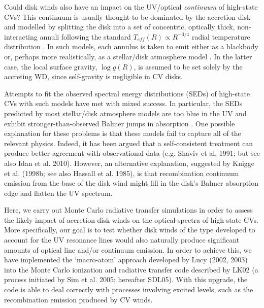 \documentclass[preprint, a4paper, 11pt]{aastex}
\begin{document}
Could disk winds also have an impact on the UV/optical {\em continuum}
of high-state CVs? This continuum is usually thought to be dominated
by the accretion disk and modelled by splitting the disk into
a set of concentric, optically thick, non-interacting annuli following
the standard $T_{eff}(R) \propto R^{-3/4}$ radial temperature
distribution \citep{shakurasunyaev1973}. In such
models, each annulus is taken to emit either as a blackbody or,
perhaps more realistically, as a stellar/disk atmosphere model
\citep{Schwarzenberg-Czerny1977,wade1984,wade1988}.
In the latter case, the local surface gravity, $\log{g}(R)$, is
assumed to be set solely by the accreting WD, since self-gravity is
negligible in CV disks.


Attempts to fit the observed spectral energy distributions (SEDs) of
high-state CVs with such models have met with mixed success. In
particular, the SEDs predicted by most stellar/disk atmosphere models 
are too blue in the UV \citep{wade1988,long1991,long1994,knigge1998} and exhibit
stronger-than-observed Balmer jumps in absorption 
\citep{wade1984,haug1987,ladous1989b,knigge1998}. One possible
explanation for these problems is that these models fail to capture
all of the relevant physics. Indeed, it has been argued that a
self-consistent treatment can 
produce better agreement with observational data (e.g. Shaviv et
al. 1991;  but see also Idan et al. 2010).
\nocite{idanshaviv2010} \nocite{shaviv1991}
However, an alternative explanation, suggested by Knigge et al.
(1998b; see also Hassall et al. 1985)\nocite{KLWB98,hassall}, 
is that recombination continuum emission from the base of the 
disk wind might fill in the disk's
Balmer absorption edge and flatten the UV spectrum. 

\nocite{groot2004}
\nocite{beuermann1990}
\nocite{beuermann1992}

Here, we carry out Monte Carlo radiative transfer simulations in
order to assess the likely impact of accretion disk winds on the
optical spectra of high-state CVs. More specifically, our goal is to
test whether disk winds of the type developed to account for the UV
resonance lines would also naturally produce significant amounts of  
optical line and/or continuum emission. In order to achieve this, we
have implemented the `macro-atom' approach developed by Lucy
(2002, 2003) into the Monte Carlo ionization and radiative transfer
code described by LK02 (a process initiated by Sim et al. 2005; hereafter SDL05). 
With this upgrade, the code is able to deal correctly with processes involving
excited levels, such as the recombination emission produced by CV
winds. 
\end{document}
